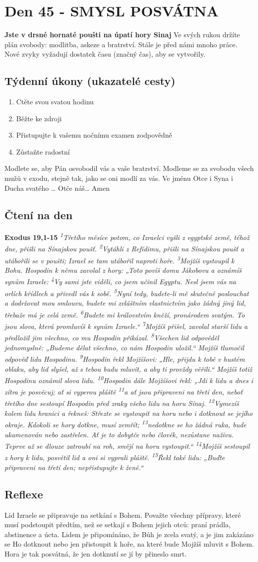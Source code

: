 \documentclass[11pt]{article}
\newcommand{\zacatekSedmyTyden}{
  \textbf{Jste v drsné hornaté poušti na úpatí hory Sinaj} \newline 
  Ve svých rukou držíte plán svobody: modlitba, askeze a bratrství. Stále je před námi mnoho práce. Nové zvyky vyžadují dostatek času (značný čas), aby se vytvořily.

  \subsection*{Týdenní úkony (ukazatelé cesty)}
\begin{enumerate}
  \item Ctěte svou svatou hodinu
  \item Běžte ke zdroji
  \item Přistupujte k vašemu nočnímu examen zodpovědně
  \item Zůstaňte radostní
\end{enumerate}
Modlete se, aby Pán osvobodil vás a vaše bratrství. \newline
Modleme se za svobodu všech mužů v exodu, stejně tak, jako se oni modlí za vás.\newline
Ve jménu Otce i Syna i Ducha svatého …  Otče náš… Amen
}
\begin{document}
\newpage
\section{Den 45 - SMYSL POSVÁTNA}
\zacatekSedmyTyden
\subsection*{Čtení na den}
\textbf{Exodus 19,1-15}
\newline
\textit{
\textsuperscript{1}Třetího měsíce potom, co Izraelci vyšli z egyptské země, téhož dne, přišli na Sínajskou poušť.
\textsuperscript{2}Vytáhli z Refídimu, přišli na Sínajskou poušť a utábořili se v poušti; Izrael se tam utábořil naproti hoře.
\textsuperscript{3}Mojžíš vystoupil k Bohu. Hospodin k němu zavolal z hory: „Toto povíš domu Jákobovu a oznámíš synům Izraele:
\textsuperscript{4}Vy sami jste viděli, co jsem učinil Egyptu. Nesl jsem vás na orlích křídlech a přivedl vás k sobě.
\textsuperscript{5}Nyní tedy, budete-li mě skutečně poslouchat a dodržovat mou smlouvu, budete mi zvláštním vlastnictvím jako žádný jiný lid, třebaže má je celá země.
\textsuperscript{6}Budete mi královstvím kněží, pronárodem svatým. To jsou slova, která promluvíš k synům Izraele.“
\textsuperscript{7}Mojžíš přišel, zavolal starší lidu a předložil jim všechno, co mu Hospodin přikázal.
\textsuperscript{8}Všechen lid odpověděl jednomyslně: „Budeme dělat všechno, co nám Hospodin uložil.“ Mojžíš tlumočil odpověď lidu Hospodinu.
\textsuperscript{9}Hospodin řekl Mojžíšovi: „Hle, přijdu k tobě v hustém oblaku, aby lid slyšel, až s tebou budu mluvit, a aby ti provždy věřili.“ Mojžíš totiž Hospodinu oznámil slova lidu.
\textsuperscript{10}Hospodin dále Mojžíšovi řekl: „Jdi k lidu a dnes i zítra je posvěcuj; ať si vyperou pláště
\textsuperscript{11}a ať jsou připraveni na třetí den, neboť třetího dne sestoupí Hospodin před zraky všeho lidu na horu Sínaj.
\textsuperscript{12}Vymezíš kolem lidu hranici a řekneš: Střezte se vystoupit na horu nebo i dotknout se jejího okraje. Kdokoli se hory dotkne, musí zemřít;
\textsuperscript{13}nedotkne se ho žádná ruka, bude ukamenován nebo zastřelen. Ať je to dobytče nebo člověk, nezůstane naživu. Teprve až se dlouze zatroubí na roh, smějí na horu vystoupit.“
\textsuperscript{14}Mojžíš sestoupil z hory k lidu, posvětil lid a oni si vyprali pláště.
\textsuperscript{15}Řekl také lidu: „Buďte připraveni na třetí den; nepřistupujte k ženě.“
}

\subsection*{Reflexe}
Lid Izraele se připravuje na setkání s Bohem. Považte všechny přípravy, které musí podstoupit předtím, než se setkají
s Bohem jejich otců: praní prádla, abstinence a úcta. Lidem je připomínáno, že Bůh je zcela svatý, a je jim zakázáno se
Ho dotknout nebo jen přistoupit k hoře, na které bude Mojžíš mluvit s Bohem. Hora je tak posvátná, že jen dotknutí se
jí by přineslo smrt.
\end{document}
